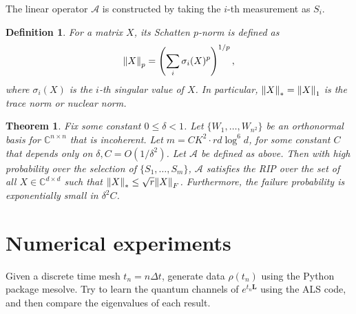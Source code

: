\documentclass[10pt]{article}  %
\theoremstyle{plain}
\newtheorem{theorem}{Theorem}[section]
\newtheorem{definition}[thm]{Definition}
\numberwithin{equation}{section}
\def\mA{\mathcal{A}}
\def\C{\mathbb{C}}
\newcommand{\bL}{\mathbf{L}}
\renewcommand{\C}{\mathbb{C}}
\begin{document}
The linear operator $\mA$ is constructed by taking the $i$-th measurement as $S_i$. 
\begin{definition}
	For a matrix $X$, its Schatten $p$-norm is defined as 
	\begin{equation}
		\norm{X}_p = \left(\sum_{i}\sigma_i(X)^p\right)^{1/p},
	\end{equation}
	where $\sigma_i(X)$ is the $i$-th singular value of $X$. In particular, $\norm{X}_* = \norm{X}_1$ is the trace norm or nuclear norm. 
\end{definition}

\begin{theorem}\cite[Theorem 2.1]{liuUniversalLowrankMatrix2011}
	Fix some constant $0 \leq \delta <1$. Let $\{W_1, \dots, W_{n^2}\}$ be an orthonormal basis for $\C^{n \times n}$ that is incoherent. Let $m = CK^2\cdot rd \log^6 d$, for some constant $C$ that depends only on $\delta, C = O(1/\delta^2)$. Let $\mA$ be defined as above. Then with high probability over the selection of $\{S_1, \dots, S_m\}$, $\mA$ satisfies the RIP over the set of all $X\in \C^{d \times d}$ such that $\norm{X}_* \leq \sqrt{r} \norm{X}_F$. Furthermore, the failure probability is exponentially small in $\delta^2C$. 
\end{theorem}



\section{Numerical experiments}

Given a discrete time mesh $t_n = n \Delta t$, generate data $\rho(t_n)$ using the Python package mesolve. Try to learn the quantum channels of $e^{t_n\bL}$ using the ALS code, and then compare the eigenvalues of each result.



\printbibliography
\end{document}
